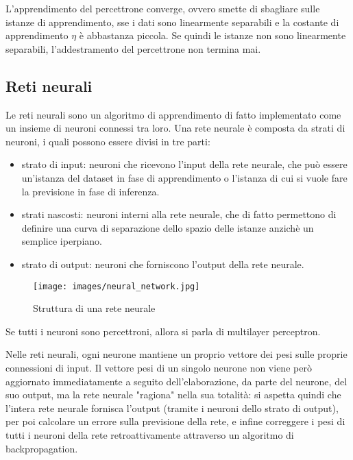 L'apprendimento del percettrone converge, ovvero smette di sbagliare sulle istanze di apprendimento, sse i dati sono linearmente separabili e la costante di apprendimento $\eta$ è abbastanza piccola.
Se quindi le istanze non sono linearmente separabili, l'addestramento del percettrone non termina mai.

\subsection{Reti neurali}
Le reti neurali sono un algoritmo di apprendimento di fatto implementato come un insieme di neuroni connessi tra loro.
Una rete neurale è composta da strati di neuroni, i quali possono essere divisi in tre parti:
\begin{itemize}
    \item strato di input: neuroni che ricevono l'input della rete neurale, che può essere un'istanza del dataset in fase di apprendimento o l'istanza di cui si vuole fare la previsione in fase di inferenza.
    \item strati nascosti: neuroni interni alla rete neurale, che di fatto permettono di definire una curva di separazione dello spazio delle istanze anzichè un semplice iperpiano.
    \item strato di output: neuroni che forniscono l'output della rete neurale.
\end{itemize}
\begin{figure}[h]
    \centering
    \texttt{[image: images/neural\_network.jpg]}
    \caption{Struttura di una rete neurale}
    \label{fig:neural_network}
\end{figure}
Se tutti i neuroni sono percettroni, allora si parla di multilayer perceptron.

Nelle reti neurali, ogni neurone mantiene un proprio vettore dei pesi sulle proprie connessioni di input.
Il vettore pesi di un singolo neurone non viene però aggiornato immediatamente a seguito dell'elaborazione, da parte del neurone, del suo output, ma la rete neurale "ragiona" nella sua totalità: si aspetta quindi che l'intera rete neurale fornisca l'output (tramite i neuroni dello strato di output), per poi calcolare un errore sulla previsione della rete, e infine correggere i pesi di tutti i neuroni della rete retroattivamente attraverso un algoritmo di backpropagation.

